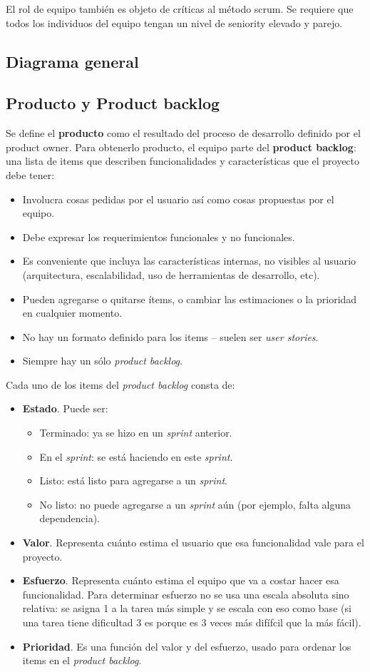 \documentclass[]{article}
\begin{document}
El rol de equipo también es objeto de críticas al método scrum. Se requiere que todos los individuos del equipo tengan un nivel de seniority elevado y parejo.

\subsection{Diagrama general}

\subsection{Producto y Product backlog}
Se define el \textbf{producto} como el resultado del proceso de desarrollo definido por el product owner. Para obtenerlo producto, el equipo parte del \textbf{product backlog}: una lista de items que describen funcionalidades y características que el proyecto debe tener:
\begin{itemize}
	\item Involucra cosas pedidas por el usuario así como cosas propuestas por el equipo.
	\item Debe expresar los requerimientos funcionales y no funcionales.
	\item Es conveniente que incluya las características internas, no visibles al usuario (arquitectura, escalabilidad, uso de herramientas de desarrollo, etc).
	\item Pueden agregarse o quitarse ítems, o cambiar las estimaciones o la prioridad en cualquier momento.
	\item No hay un formato definido para los items – suelen ser \emph{user stories}.
	\item Siempre hay un sólo \emph{product backlog}.
\end{itemize}

Cada uno de los items del \emph{product backlog} consta de:
\begin{itemize}
	\item \textbf{Estado}. Puede ser:
	\begin{itemize}
		\item Terminado: ya se hizo en un \emph{sprint} anterior.
		\item En el \emph{sprint}: se está haciendo en este \emph{sprint}.
		\item Listo: está listo para agregarse a un \emph{sprint}.
		\item No listo: no puede agregarse a un \emph{sprint} aún (por ejemplo, falta alguna dependencia).
	\end{itemize}
	\item \textbf{Valor}. Representa cuánto estima el usuario que esa funcionalidad vale para el proyecto.
	\item \textbf{Esfuerzo}. Representa cuánto estima el equipo que va a costar hacer esa funcionalidad. Para determinar esfuerzo no se usa una escala absoluta sino relativa: se asigna 1 a la tarea más simple y se escala con eso como base (si una tarea tiene dificultad 3 es porque es 3 veces más difífcil que la más fácil).
	\item \textbf{Prioridad}. Es una función del valor y del esfuerzo, usado para ordenar los items en el \emph{product backlog}.
\end{itemize}
\end{document}
